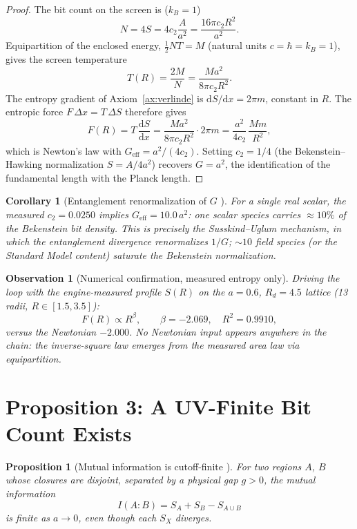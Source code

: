 \documentclass[11pt,a4paper]{article}
\newtheorem{proposition}{Proposition}
\newtheorem{observation}{Observation}
\newtheorem{corollary}{Corollary}
\theoremstyle{definition}
\theoremstyle{remark}
\newcommand{\dd}{\mathrm{d}}
\begin{document}
\begin{proof}
The bit count on the screen is ($k_B = 1$)
\[
N = 4S = 4 c_2 \frac{A}{a^2} = \frac{16\pi c_2 R^2}{a^2}.
\]
Equipartition of the enclosed energy, $\tfrac12 N T = M$ (natural units
$c = \hbar = k_B = 1$), gives the screen temperature
\[
T(R) = \frac{2M}{N} = \frac{M a^2}{8\pi c_2 R^2}.
\]
The entropy gradient of Axiom~\ref{ax:verlinde} is
$\dd S/\dd x = 2\pi m$, constant in $R$. The entropic force
$F\,\Delta x = T\,\Delta S$ therefore gives
\[
F(R) = T\,\frac{\dd S}{\dd x}
= \frac{M a^2}{8\pi c_2 R^2}\cdot 2\pi m
= \frac{a^2}{4 c_2}\,\frac{M m}{R^2},
\]
which is Newton's law with $G_{\mathrm{eff}} = a^2/(4c_2)$. Setting
$c_2 = 1/4$ (the Bekenstein--Hawking normalization $S = A/4a^2$) recovers
$G = a^2$, the identification of the fundamental length with the Planck
length.
\end{proof}

\begin{corollary}[Entanglement renormalization of $G$ \cite{SusskindUglum1994}]
For a single real scalar, the measured $c_2 = 0.0250$ implies
$G_{\mathrm{eff}} = 10.0\,a^2$: one scalar species carries
$\approx 10\%$ of the Bekenstein bit density. This is precisely the
Susskind--Uglum mechanism, in which the entanglement divergence renormalizes
$1/G$; $\sim 10$ field species (or the Standard Model content) saturate the
Bekenstein normalization.
\end{corollary}

\begin{observation}[Numerical confirmation, measured entropy only]
Driving the loop with the engine-measured profile $S(R)$ on the
$a = 0.6$, $R_d = 4.5$ lattice (13 radii, $R \in [1.5, 3.5]$):
\[
F(R) \propto R^{\beta}, \qquad
\boxed{\beta = -2.069}, \quad R^2 = 0.9910,
\]
versus the Newtonian $-2.000$. No Newtonian input appears anywhere in the
chain: the inverse-square law \emph{emerges} from the measured area law via
equipartition.
\end{observation}

\section{Proposition 3: A UV-Finite Bit Count Exists}
\label{prop:mi}

\begin{proposition}[Mutual information is cutoff-finite \cite{Wolf2008}]
For two regions $A$, $B$ whose closures are disjoint, separated by a physical
gap $g > 0$, the mutual information
\begin{equation}
I(A\!:\!B) = S_A + S_B - S_{A\cup B}
\end{equation}
is finite as $a \to 0$, even though each $S_X$ diverges.
\end{proposition}
\end{document}
